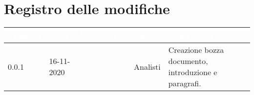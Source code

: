 \section*{Registro delle modifiche}
{

\newlength{\freewidth}
\setlength{\freewidth}{\dimexpr\textwidth-10\tabcolsep}
\renewcommand{\arraystretch}{1.5}
\centering
\setlength{\aboverulesep}{0pt}
\setlength{\belowrulesep}{0pt}
\begin{longtable}{C{.13\freewidth} C{.15\freewidth} C{.26\freewidth} C{.18\freewidth} C{.282379\freewidth}}
	\toprule
{}
\textcolor{white}{\textbf{Versione}}&
\textcolor{white}{\textbf{Data}}&
\textcolor{white}{\textbf{Nominativo}}&
\textcolor{white}{\textbf{Ruolo}}&
\textcolor{white}{\textbf{Descrizione}}\\	
\toprule
\endhead

0.0.1 & 16-11-2020 & \teamname{} & Analisti & Creazione bozza documento, introduzione e paragrafi. \\	
\bottomrule
\end{longtable}
}
